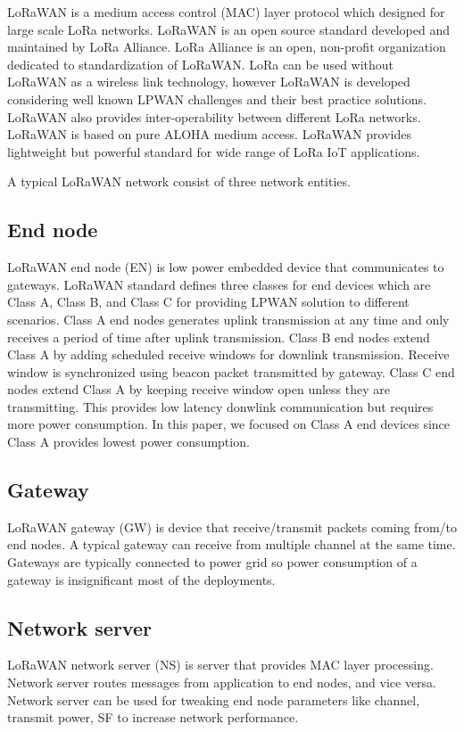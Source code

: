 \documentclass[conference]{IEEEtran}
\begin{document}
\par LoRaWAN is a medium access control (MAC) layer protocol which designed for large scale LoRa networks. LoRaWAN is an open source standard developed and maintained by LoRa Alliance. LoRa Alliance is an open, non-profit organization dedicated to standardization of LoRaWAN. LoRa can be used without LoRaWAN as a wireless link technology, however LoRaWAN is developed considering well known LPWAN challenges and their best practice solutions. LoRaWAN also provides inter-operability between different LoRa networks. LoRaWAN is based on pure ALOHA medium access. LoRaWAN provides lightweight but powerful standard for wide range of LoRa IoT applications.

\par A typical LoRaWAN network consist of three network entities.

\subsection{End node}
\par LoRaWAN end node (EN) is low power embedded device that communicates to gateways. LoRaWAN standard defines three classes for end devices which are Class A, Class B, and Class C for providing LPWAN solution to different scenarios. Class A end nodes generates uplink transmission at any time and only receives a period of time after uplink transmission. Class B end nodes extend Class A by adding scheduled receive windows for downlink transmission. Receive window is synchronized using beacon packet transmitted by gateway. Class C end nodes extend Class A by keeping receive window open unless they are transmitting. This provides low latency donwlink communication but requires more power consumption. In this paper, we focused on Class A end devices since Class A provides lowest power consumption.

\subsection{Gateway}
\par LoRaWAN gateway (GW) is device that receive/transmit packets coming from/to end nodes. A typical gateway can receive from multiple channel at the same time. Gateways are typically connected to power grid so power consumption of a gateway is insignificant most of the deployments.

\subsection{Network server}
\par LoRaWAN network server (NS) is server that provides MAC layer processing. Network server routes messages from application to end nodes, and vice versa. Network server can be used for tweaking end node parameters like channel, transmit power, SF to increase network performance.
\end{document}
